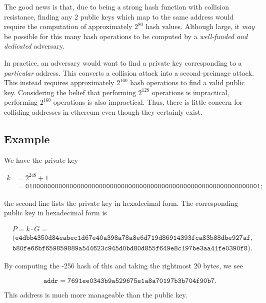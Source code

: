 The good news is that, due to \Keccak{} being a strong \gls{hash function}
with collision resistance,
finding any 2 public keys which map to the same address would require
the computation of approximately $2^{80}$ hash values.
Although large, it \emph{may} be possible for this many hash operations
to be computed by a \emph{well-funded and dedicated} adversary.

In practice, an adversary would want to find a private key
corresponding to a \emph{particular} address.
This converts a collision attack into a second-preimage attack.
This instead requires approximately $2^{160}$ hash operations
to find a valid public key.
Considering the belief that performing $2^{128}$ operations is impractical,
performing $2^{160}$ operations is also impractical.
Thus, there is little concern for colliding addresses in \gls{ethereum}
even though they certainly exist.

\subsection{Example}

\begin{example}

We have the private key

\begin{align}
    k &= 2^{248} + 1 \nonumber\\
&= \texttt{0100000000000000000000000000000000000000000000000000000000000001};
\end{align}

\noindent
the second line lists the private key in hexadecimal form.
The corresponding public key in hexadecimal form is

\begin{align}
    &P = k\cdot G = \nonumber\\
    &(\texttt{e4dbb4350d84eabec1d67e40a398a78a8e6d719d86914393fca83b88dbe927af},
        \nonumber\\
    &\texttt{b80fe66bf659859889a544623c945d0bd80d855f649e8c197be3aa41fe0390f8}).
\end{align}

\noindent
By computing the \Keccak{}-256 hash of this and taking the rightmost
20 bytes, we see

\begin{equation}
    \texttt{addr} = \texttt{7691ee0343b9a529675e1a8a70197b3b704f90b7}.
\end{equation}

\noindent
This address is much more manageable than the public key.
\end{example}



